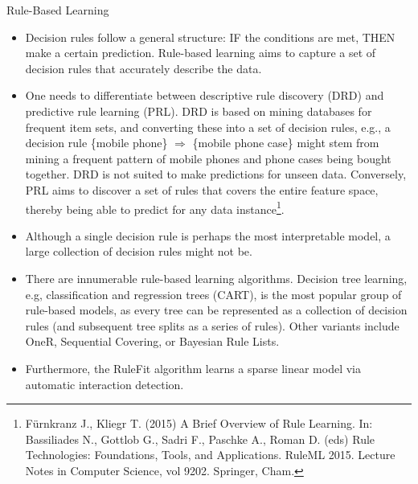 \documentclass[11pt,compress,t,notes=noshow, xcolor=table]{beamer}
\begin{document}
\begin{vbframe}{Rule-Based Learning}

\begin{itemize}
\setlength\itemsep{2em}
\item 
Decision rules follow a general structure: IF the conditions are met, THEN make a certain prediction. Rule-based learning aims to capture a set of decision rules that accurately describe the data.
\item One needs to differentiate between descriptive rule discovery (DRD) and predictive rule learning (PRL). DRD is based on mining databases for frequent item sets, and converting these into a set of decision rules, e.g., a decision rule \{mobile phone\} $\Rightarrow$ \{mobile phone case\} might stem from mining a frequent pattern of mobile phones and phone cases being bought together. DRD is not suited to make predictions for unseen data. Conversely, PRL aims to discover a set of rules that covers the entire feature space, thereby being able to predict for any data instance\footnote[frame]{Fürnkranz J., Kliegr T. (2015) A Brief Overview of Rule Learning. In: Bassiliades N., Gottlob G., Sadri F., Paschke A., Roman D. (eds) Rule Technologies: Foundations, Tools, and Applications. RuleML 2015. Lecture Notes in Computer Science, vol 9202. Springer, Cham.}. 
\item Although a single decision rule is perhaps the most interpretable model, a large collection of decision rules might not be.
\item There are innumerable rule-based learning algorithms. Decision tree learning, e.g, classification and regression trees (CART), is the most popular group of rule-based models, as every tree can be represented as a collection of decision rules (and subsequent tree splits as a series of rules). Other variants include OneR, Sequential Covering, or Bayesian Rule Lists.
\item Furthermore, the RuleFit algorithm learns a sparse linear model via automatic interaction detection.
\end{itemize}

\end{vbframe}


\endlecture
\end{document}
